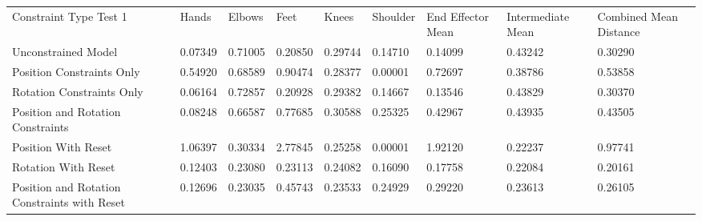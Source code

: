 \begin{table}[]
\begin{tabular}{lllllllll}
Constraint Type Test 1                       & Hands   & Elbows  & Feet    & Knees   & Shoulder & End Effector Mean & Intermediate Mean & Combined Mean Distance \\
Unconstrained Model                          & 0.07349 & 0.71005 & 0.20850 & 0.29744 & 0.14710  & 0.14099           & 0.43242           & 0.30290                \\
Position Constraints Only                    & 0.54920 & 0.68589 & 0.90474 & 0.28377 & 0.00001  & 0.72697           & 0.38786           & 0.53858                \\
Rotation Constraints Only                    & 0.06164 & 0.72857 & 0.20928 & 0.29382 & 0.14667  & 0.13546           & 0.43829           & 0.30370                \\
Position and Rotation Constraints            & 0.08248 & 0.66587 & 0.77685 & 0.30588 & 0.25325  & 0.42967           & 0.43935           & 0.43505                \\
Position With Reset                          & 1.06397 & 0.30334 & 2.77845 & 0.25258 & 0.00001  & 1.92120           & 0.22237           & 0.97741                \\
Rotation With Reset                          & 0.12403 & 0.23080 & 0.23113 & 0.24082 & 0.16090  & 0.17758           & 0.22084           & 0.20161                \\
Position and Rotation Constraints with Reset & 0.12696 & 0.23035 & 0.45743 & 0.23533 & 0.24929  & 0.29220           & 0.23613           & 0.26105               
\end{tabular}
\end{table}